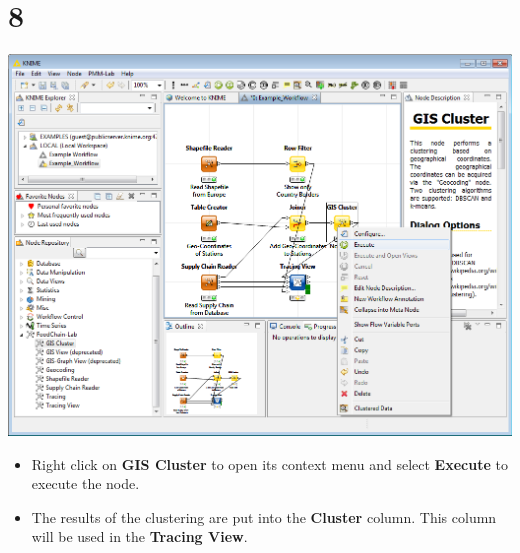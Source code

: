 \documentclass{beamer}
\begin{document}
\section{8}
\begin{frame}
	\begin{center}
  		\includegraphics[height=0.6\textheight]{8.png}
	\end{center}
	\begin{itemize}
		\item Right click on \textbf{GIS Cluster} to open its context menu and select \textbf{Execute} to execute the node.
		\item The results of the clustering are put into the \textbf{Cluster} column. This column will be used in the \textbf{Tracing View}.
	\end{itemize}
\end{frame}
\end{document}

